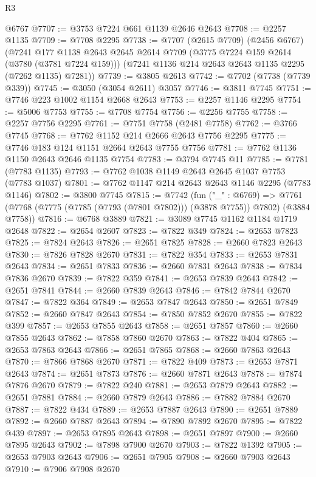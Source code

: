 \begin{lexlean}{R3}
\begin{coremodule}
    @6767
@7707 := @3753 @7224 @661 @1139 @2646 @2643
@7708 := @2257 @1135
@7709 := @7708 @2295
@7738 := @7707
    (@2615 @7709)
    (@2456 @6767)
    (@7241
      @177
      @1138
      @2643
      @2645
      @2614
      @7709
      (@3775 @7224 @159 @2614 (@3780 (@3781 @7224 @159)))
      (@7241 @1136 @214 @2643 @2643 @1135 @2295 (@7262 @1135) @7281))
@7739 := @3805 @2613
@7742 := @7702 (@7738 (@7739 @339))
@7745 := @3050 (@3054 @2611) @3057
@7746 := @3811 @7745
@7751 := @7746 @223 @1002 @1154 @2668 @2643
@7753 := @2257 @1146 @2295
@7754 := @5006 @7753
@7755 := @7708 @7754
@7756 := @2256 @7755
@7758 := @2257 @7756 @2295
@7761 := @7751 @7758 (@2481 @7758)
@7762 := @3766 @7745
@7768 := @7762 @1152 @214 @2666 @2643 @7756 @2295
@7775 := @7746 @183 @124 @1151 @2664 @2643 @7755 @7756
@7781 := @7762 @1136 @1150 @2643 @2646 @1135 @7754
@7783 := @3794 @7745 @11
@7785 := @7781 (@7783 @1135)
@7793 := @7762 @1038 @1149 @2643 @2645 @1037 @7753 (@7783 @1037)
@7801 := @7762 @1147 @214 @2643 @2643 @1146 @2295 (@7783 @1146)
@7802 := @3800 @7745
@7815 := @7742
    (fun ("_" : @6769) =>
    @7761 (@7768 (@7775 (@7785 (@7793 (@7801 @7802))) (@3878 @7755)) @7802) (@3884 @7758))
@7816 := @6768 @3889
@7821 := @3089 @7745 @1162 @1184 @1719 @2648
@7822 := @2654 @2607
@7823 := @7822 @349
@7824 := @2653 @7823
@7825 := @7824 @2643
@7826 := @2651 @7825
@7828 := @2660 @7823 @2643
@7830 := @7826 @7828 @2670
@7831 := @7822 @354
@7833 := @2653 @7831 @2643
@7834 := @2651 @7833
@7836 := @2660 @7831 @2643
@7838 := @7834 @7836 @2670
@7839 := @7822 @359
@7841 := @2653 @7839 @2643
@7842 := @2651 @7841
@7844 := @2660 @7839 @2643
@7846 := @7842 @7844 @2670
@7847 := @7822 @364
@7849 := @2653 @7847 @2643
@7850 := @2651 @7849
@7852 := @2660 @7847 @2643
@7854 := @7850 @7852 @2670
@7855 := @7822 @399
@7857 := @2653 @7855 @2643
@7858 := @2651 @7857
@7860 := @2660 @7855 @2643
@7862 := @7858 @7860 @2670
@7863 := @7822 @404
@7865 := @2653 @7863 @2643
@7866 := @2651 @7865
@7868 := @2660 @7863 @2643
@7870 := @7866 @7868 @2670
@7871 := @7822 @409
@7873 := @2653 @7871 @2643
@7874 := @2651 @7873
@7876 := @2660 @7871 @2643
@7878 := @7874 @7876 @2670
@7879 := @7822 @240
@7881 := @2653 @7879 @2643
@7882 := @2651 @7881
@7884 := @2660 @7879 @2643
@7886 := @7882 @7884 @2670
@7887 := @7822 @434
@7889 := @2653 @7887 @2643
@7890 := @2651 @7889
@7892 := @2660 @7887 @2643
@7894 := @7890 @7892 @2670
@7895 := @7822 @439
@7897 := @2653 @7895 @2643
@7898 := @2651 @7897
@7900 := @2660 @7895 @2643
@7902 := @7898 @7900 @2670
@7903 := @7822 @1392
@7905 := @2653 @7903 @2643
@7906 := @2651 @7905
@7908 := @2660 @7903 @2643
@7910 := @7906 @7908 @2670

\end{coremodule}
\end{lexlean}
